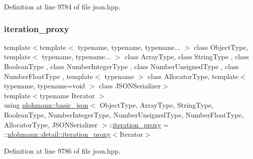 Definition at line 9784 of file json.\+hpp.

\mbox{\label{classnlohmann_1_1basic__json_afb49d897bc58d6678f4471925bbfbb01}} 
\subsubsection{\texorpdfstring{iteration\+\_\+proxy}{iteration\_proxy}}
{\footnotesize\ttfamily template$<$template$<$ typename, typename, typename... $>$ class Object\+Type, template$<$ typename, typename... $>$ class Array\+Type, class String\+Type , class Boolean\+Type , class Number\+Integer\+Type , class Number\+Unsigned\+Type , class Number\+Float\+Type , template$<$ typename $>$ class Allocator\+Type, template$<$ typename, typename=void $>$ class J\+S\+O\+N\+Serializer$>$ \\
template$<$typename Iterator $>$ \\
using \hyperlink{classnlohmann_1_1basic__json}{nlohmann\+::basic\+\_\+json}$<$ Object\+Type, Array\+Type, String\+Type, Boolean\+Type, Number\+Integer\+Type, Number\+Unsigned\+Type, Number\+Float\+Type, Allocator\+Type, J\+S\+O\+N\+Serializer $>$\+::\hyperlink{classnlohmann_1_1basic__json_afb49d897bc58d6678f4471925bbfbb01}{iteration\+\_\+proxy} =  \+::\hyperlink{classnlohmann_1_1detail_1_1iteration__proxy}{nlohmann\+::detail\+::iteration\+\_\+proxy}$<$Iterator$>$\hspace{0.3cm}{\ttfamily [private]}}



Definition at line 9786 of file json.\+hpp.

\mbox{\label{classnlohmann_1_1basic__json_a099316232c76c034030a38faa6e34dca}} 
